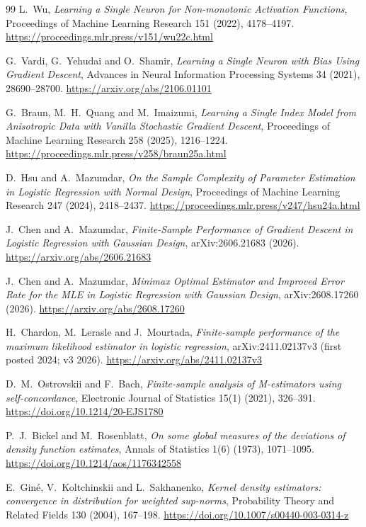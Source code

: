 \documentclass[11pt]{article}
\begin{document}
\begin{thebibliography}{99}
L.~Wu,
\emph{Learning a Single Neuron for Non-monotonic Activation Functions},
Proceedings of Machine Learning Research 151 (2022), 4178--4197.
\url{https://proceedings.mlr.press/v151/wu22c.html}

G.~Vardi, G.~Yehudai and O.~Shamir,
\emph{Learning a Single Neuron with Bias Using Gradient Descent},
Advances in Neural Information Processing Systems 34 (2021), 28690--28700.
\url{https://arxiv.org/abs/2106.01101}

G.~Braun, M.~H.~Quang and M.~Imaizumi,
\emph{Learning a Single Index Model from Anisotropic Data with Vanilla Stochastic Gradient Descent},
Proceedings of Machine Learning Research 258 (2025), 1216--1224.
\url{https://proceedings.mlr.press/v258/braun25a.html}

D.~Hsu and A.~Mazumdar,
\emph{On the Sample Complexity of Parameter Estimation in Logistic Regression with Normal Design},
Proceedings of Machine Learning Research 247 (2024), 2418--2437.
\url{https://proceedings.mlr.press/v247/hsu24a.html}

J.~Chen and A.~Mazumdar,
\emph{Finite-Sample Performance of Gradient Descent in Logistic Regression with Gaussian Design},
arXiv:2606.21683 (2026).
\url{https://arxiv.org/abs/2606.21683}

J.~Chen and A.~Mazumdar,
\emph{Minimax Optimal Estimator and Improved Error Rate for the MLE in Logistic Regression with Gaussian Design},
arXiv:2608.17260 (2026).
\url{https://arxiv.org/abs/2608.17260}

H.~Chardon, M.~Lerasle and J.~Mourtada,
\emph{Finite-sample performance of the maximum likelihood estimator in logistic regression},
arXiv:2411.02137v3 (first posted 2024; v3 2026).
\url{https://arxiv.org/abs/2411.02137v3}

D.~M.~Ostrovskii and F.~Bach,
\emph{Finite-sample analysis of M-estimators using self-concordance},
Electronic Journal of Statistics 15(1) (2021), 326--391.
\url{https://doi.org/10.1214/20-EJS1780}

P.~J.~Bickel and M.~Rosenblatt,
\emph{On some global measures of the deviations of density function estimates},
Annals of Statistics 1(6) (1973), 1071--1095.
\url{https://doi.org/10.1214/aos/1176342558}

E.~Gin\'e, V.~Koltchinskii and L.~Sakhanenko,
\emph{Kernel density estimators: convergence in distribution for weighted sup-norms},
Probability Theory and Related Fields 130 (2004), 167--198.
\url{https://doi.org/10.1007/s00440-003-0314-z}


\end{thebibliography}
\end{document}
